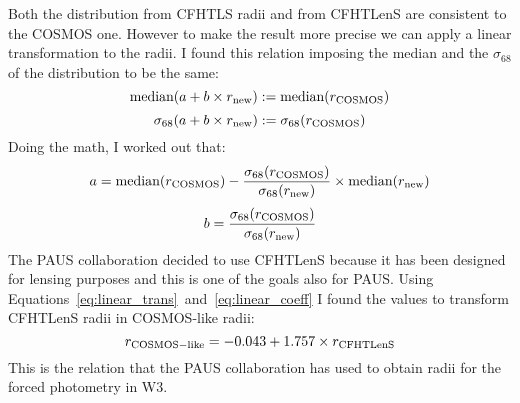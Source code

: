 \documentclass[11pt]{article}
\begin{document}
Both the distribution from CFHTLS radii and from CFHTLenS are consistent to the COSMOS one. However to make the result more precise we can apply a linear transformation to the radii. I found this relation imposing the median and the $\sigma_{68}$ of the distribution to be the same: 
\begin{equation*}
\text{median} (a+ b \times r_{\rm{new}}) := \text{median}(r_{\rm{COSMOS}})
\end{equation*}
\begin{equation}
\label{eq:linear_trans}
\sigma_{68} (a+ b \times r_{\rm{new}}) := \sigma_{68}(r_{\rm{COSMOS}})
\end{equation}
Doing the math, I worked out that:
\begin{equation*}
a = \text{median}(r_{\rm{COSMOS}}) - \frac{\sigma_{68}(r_{\rm{COSMOS}})}{\sigma_{68}(r_{\rm{new}})} \times \text{median}(r_{\rm{new}})
\end{equation*}
\begin{equation}
\label{eq:linear_coeff}
b = \frac{\sigma_{68}(r_{\rm{COSMOS}})}{\sigma_{68}(r_{\rm{new}})}
\end{equation}
The PAUS collaboration decided to use CFHTLenS because it has been designed for lensing purposes and this is one of the goals also for PAUS.
Using Equations~\ref{eq:linear_trans}~and~\ref{eq:linear_coeff} I found the values to transform CFHTLenS radii in COSMOS-like radii:
\begin{equation}
r_{\rm{COSMOS-like}} = -0.043 + 1.757 \times r_{\rm{CFHTLenS}}
\end{equation}
This is the relation that the PAUS collaboration has used to obtain radii for the forced photometry in W3. \\
\end{document}
